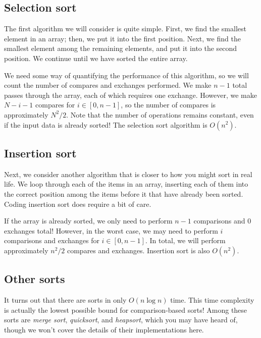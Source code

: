 \subsection{Selection sort}

The first algorithm we will consider is quite simple. First, we find the smallest element in an array; then, we put it into the first position. Next, we find the smallest element among the remaining elements, and put it into the second position. We continue until we have sorted the entire array.

We need some way of quantifying the performance of this algorithm, so we will count the number of compares and exchanges performed. We make $n-1$ total passes through the array, each of which requires one exchange. However, we make $N-i-1$ compares for $i \in [0, n-1]$, so the number of compares is approximately $N^2/2$. Note that the number of operations remains constant, even if the input data is already sorted!  The selection sort algorithm is $ O(n^2) $.


\subsection{Insertion sort}

Next, we consider another algorithm that is closer to how you might sort in real life. We loop through each of the items in an array, inserting each of them into the correct position among the items before it that have already been sorted. Coding insertion sort does require a bit of care.

If the array is already sorted, we only need to perform $n-1$ comparisons and $0$ exchanges total! However, in the worst case, we may need to perform $i$ comparisons and exchanges for $i \in [0, n-1]$. In total, we will perform approximately $n^2/2$ compares and exchanges.  Insertion sort is also $ O(n^2) $.


\subsection{Other sorts}

It turns out that there are sorts in only $O(n \log n)$ time. This time complexity is actually the lowest possible bound for comparison-based sorts! Among these sorts are \textit{merge sort}, \textit{quicksort}, and \textit{heapsort}, which you may have heard of, though we won't cover the details of their implementations here.
